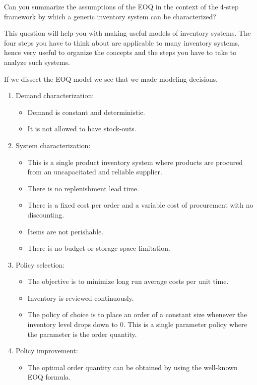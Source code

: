 \begin{exercise}
  Can you summarize the assumptions of the EOQ in the context of the 4-step framework by which
  a generic inventory system can be characterized?

  This question will help you with making useful models of inventory
  systems. The four steps you have to think about are applicable to
  many inventory systems, hence very useful to organize the concepts
  and the steps you have to take to analyze such systems.


  \begin{solution}
If we dissect the EOQ model we see that we made modeling decisions.
\begin{enumerate}
\item Demand characterization: 
\begin{itemize}
\item Demand is constant and deterministic.
\item It is not allowed to have stock-outs.
\end{itemize}
\item System characterization: 
\begin{itemize}
\item This is a single product inventory system where products are procured from an uncapacitated and reliable supplier. 
\item There is no replenishment lead time.
\item There is a fixed cost per order and a variable cost of procurement with no discounting. 
\item Items are not perishable.
\item There is no budget or storage space limitation.
\end{itemize}
\item Policy selection:
\begin{itemize}
\item The objective is to minimize long run average costs per unit time. 
\item Inventory is reviewed continuously.
\item The policy of choice is to place an order of a constant size whenever the inventory level drops down to 0. This is a single parameter policy where the parameter is the order quantity.
\end{itemize}
\item Policy improvement:
\begin{itemize}
\item The optimal order quantity can be obtained by using the well-known EOQ formula.
\end{itemize}
\end{enumerate}
  \end{solution}
\end{exercise}

